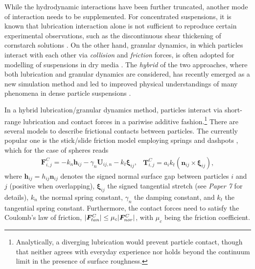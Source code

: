 While the hydrodynamic interactions have been further truncated, another mode of interaction needs to be supplemented.
For concentrated suspensions, it is known that lubrication interaction alone is not sufficient to reproduce certain experimental observations, such as the discontinuous shear thickening of cornstarch solutions \citep{Morris_annurev2020}.
On the other hand, granular dynamics, in which particles interact with each other via \emph{collision} and \emph{friction} forces, is often adopted for modelling of suspensions in dry media \citep{campbell_brennen_1985}.
The \emph{hybrid} of the two approaches, where both lubrication and granular dynamics are considered, has recently emerged as a new simulation method and led to improved physical understandings of many phenomena in dense particle suspensions \citep{Trulsson_Andreotti_Claudin, Seto_PRL2013, Mari_Seto_2014JoR, Cheal_Ness_2018, Ness_Mari_Cates}.

In a hybrid lubrication/granular dynamics method, particles interact via short-range lubrication and contact forces in a pariwise additive fashion.\footnote{Analytically, a diverging lubrication would prevent particle contact, though that neither agrees with everyday experience nor holds beyond the continuum limit in the presence of surface roughness.}
There are several models to describe frictional contacts between particles. The currently popular one is the 
stick/slide friction model employing springs and dashpots \citep{Luding2008}, which for the case of spheres reads
\begin{subequations} \label{eq:hlcd-contact}
  \begin{equation} 
    \begin{aligned}
      {\bm F}^C_{i,j} = -k_n {\bm h}_{ij}  - \gamma_n \bm{U}_{ij,n} - k_t {\bm \xi}_{ij},
    \end{aligned}
    \label{col F}
  \end{equation}
  \begin{equation} 
    \begin{aligned}
      {\bm T}^C_{i,j} = a_{i} k_t ({\bm n}_{ij} \times {\bm \xi}_{ij}),
    \end{aligned}
  \end{equation}
\end{subequations}
where ${\bm h}_{ij}=h_{ij}{\bm n}_{ij}$ denotes the signed normal surface gap between particles $i$ and $j$ (positive when overlapping),
${\bm \xi}_{ij}$ the signed tangential stretch (see \emph{Paper 7} for details),
$k_n$ the normal spring constant,
$\gamma_n$ the damping constant,
and $k_t$ the tangential spring constant.
Furthermore, the contact forces need to satisfy the Coulomb's law of friction, \ie $\lvert\bm{F}^C_{tan}\rvert \leq \mu_c\lvert\bm{F}^C_{nor}\rvert$, with $\mu_c$ being the friction coefficient. 

